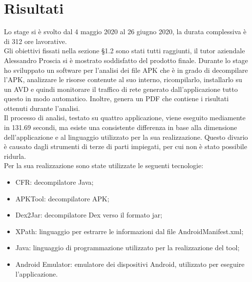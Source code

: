 \section{Risultati}\label{sec:risultati}
Lo stage si è svolto dal 4 maggio 2020 al 26 giugno 2020, la durata complessiva è di 312 ore lavorative.\\
Gli obiettivi fissati nella sezione \S1.2 sono stati tutti raggiunti, il tutor aziendale Alessandro Proscia si è mostrato soddisfatto del prodotto finale.
Durante lo stage ho sviluppato un software per l'analisi dei file APK che è in grado di decompilare l'APK, analizzare le risorse contenute al suo interno, ricompilarlo, installarlo su un AVD e quindi monitorare il traffico di rete generato dall'applicazione tutto questo in modo automatico.
Inoltre, genera un PDF che contiene i risultati ottenuti durante l'analisi.\\
Il processo di analisi, testato su quattro applicazione, viene eseguito mediamente in 131.69 secondi, ma esiste una consistente differenza in base alla dimensione dell'applicazione e al linguaggio utilizzato per la sua realizzazione.
Questo divario è causato dagli strumenti di terze di parti impiegati, per cui non è stato possibile ridurla.
\\
Per la sua realizzazione sono state utilizzate le seguenti tecnologie:
\begin{itemize}
    \item CFR: decompilatore Java;
    \item APKTool: decompilatore APK;
    \item Dex2Jar: decompilatore Dex verso il formato jar;
    \item XPath: linguaggio per estrarre le informazioni dal file AndroidManifest.xml;
    \item Java: linguaggio di programmazione utilizzato per la realizzazione del tool;
    \item Android Emulator: emulatore dei dispositivi Android, utilizzato per eseguire l'applicazione.
\end{itemize}
